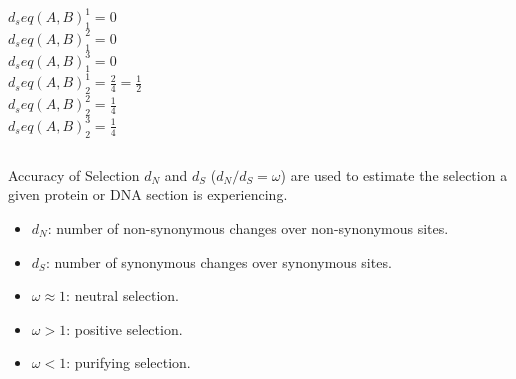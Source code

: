 \documentclass{beamer}
\begin{document}
\begin{frame}[noframenumbering] %
\centering{\resizebox{0.85\linewidth}{!}{%

}}

\vspace{1em}
\begin{columns}
$d_seq(A,B)^1_1=0$ \\
$d_seq(A,B)^2_1=0$ \\
$d_seq(A,B)^3_1=0$ \\
$d_seq(A,B)^1_2=\frac{2}{4}=\frac{1}{2}$ \\
$d_seq(A,B)^2_2=\frac{1}{4}$ \\
$d_seq(A,B)^3_2=\frac{1}{4}$ \\
\end{columns}
\end{frame} %

\begin{frame}[noframenumbering]{Accuracy of Selection} %
$d_N$ and $d_S$ ($d_N/d_S = \omega$) are used to estimate the selection a given protein or DNA
section is experiencing.

\vspace{1em}
\begin{itemize}
	\item $d_N$: number of non-synonymous changes over non-synonymous sites.
	\item $d_S$: number of synonymous changes over synonymous sites.
	\item $\omega \approx 1$: neutral selection.
	\item $\omega > 1$: positive selection.
	\item $\omega < 1$: purifying selection.
\end{itemize}
\end{frame} %
\end{document}
